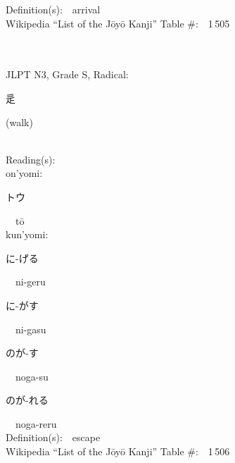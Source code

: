 \begin{multicols}{2}
Definition(s):\ \ arrival \\
Wikipedia ``List of the J\=oy\=o Kanji'' Table \#:\ \ 1\,505 \\
\ \ \\
{\fontsize{34pt}{40pt}  }\ \ \\  %
{JLPT N3, Grade S, Radical:\ \ {\begin{CJK}{UTF8}{min} 辵 \end{CJK}} (walk) } \\
Reading(s):\ \ \\
{\hspace*{1em}}on'yomi:\ \ \\
{\hspace*{2em}}{\begin{CJK}{UTF8}{min} トウ \end{CJK}}\ \ t\=o\ \ \\
{\hspace*{1em}}kun'yomi:\ \ \\
{\hspace*{2em}}{\begin{CJK}{UTF8}{min} に-げる \end{CJK}}\ \ ni-geru\ \ \\
{\hspace*{2em}}{\begin{CJK}{UTF8}{min} に-がす \end{CJK}}\ \ ni-gasu\ \ \\
{\hspace*{2em}}{\begin{CJK}{UTF8}{min} のが-す \end{CJK}}\ \ noga-su\ \ \\
{\hspace*{2em}}{\begin{CJK}{UTF8}{min} のが-れる \end{CJK}}\ \ noga-reru\ \ \\
Definition(s):\ \ escape \\
Wikipedia ``List of the J\=oy\=o Kanji'' Table \#:\ \ 1\,506 \\
\ \ \\
{\fontsize{34pt}{40pt}  }\ \ \\  %

\end{multicols}

